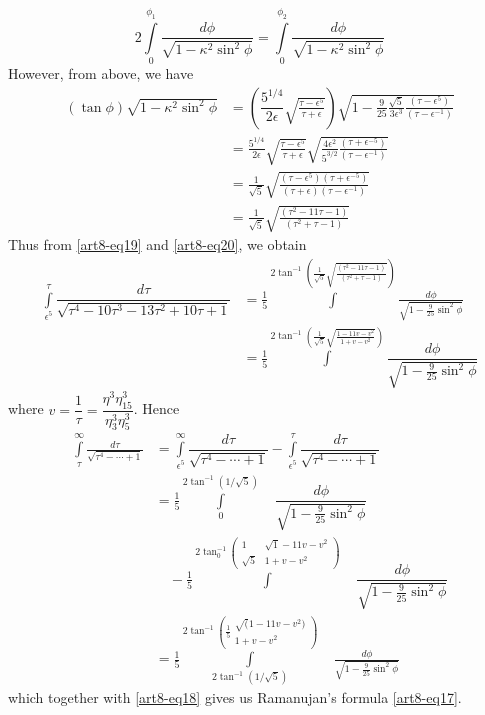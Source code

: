 \begin{equation}
2\int\limits^{\phi_{1}}_{0}\dfrac{d\phi}{\sqrt{1-\kappa^{2}\sin^{2}\phi}}=\int\limits^{\phi_{2}}_{0}\dfrac{d\phi}{\sqrt{1-\kappa^{2}\sin^{2}\phi}}\label{art8-eq20}
\end{equation}
However, from above, we have
\begin{align*}
(\tan \phi)\sqrt{1-\kappa^{2}\sin^{2}\phi} &=\left(\dfrac{5^{1/4}}{2\epsilon}\sqrt{\frac{\tau-\epsilon^{5}}{\tau+\epsilon}}\right)\sqrt{1-\frac{9}{25}\frac{\sqrt{5}}{3\epsilon^{3}}\frac{(\tau-\epsilon^{5})}{(\tau-\epsilon^{-1})}}\\
&= \frac{5^{1/4}}{2\epsilon}\sqrt{\frac{\tau-\epsilon^{5}}{\tau+\epsilon}}\sqrt{\frac{4\epsilon^{2}}{5^{3/2}}\frac{(\tau+\epsilon^{-5})}{(\tau-\epsilon^{-1})}}\\
&= \frac{1}{\sqrt{5}}\sqrt{\frac{(\tau-\epsilon^{5})(\tau+\epsilon^{-5})}{(\tau+\epsilon)(\tau-\epsilon^{-1})}}\\
&= \frac{1}{\sqrt{5}}\sqrt{\frac{(\tau^{2}-11\tau-1)}{(\tau^{2}+\tau-1)}}
\end{align*}\pageoriginale
Thus from \eqref{art8-eq19} and \eqref{art8-eq20}, we obtain
\begin{align*}
\int\limits^{\tau}_{\epsilon^{5}}\dfrac{d\tau}{\sqrt{\tau^{4}-10\tau^{3}-13\tau^{2}+10\tau+1}} &= \frac{1}{5}\int\limits^{2\tan^{-1}\left(\frac{1}{\sqrt{5}}\sqrt{\frac{(\tau^{2}-11\tau-1)}{(\tau^{2}+\tau-1)}}\right)}\frac{d\phi}{\sqrt{1-\frac{9}{25}\sin^{2}\phi}}\\
&= \frac{1}{5}\int\limits^{2\tan^{-1}\left(\frac{1}{\sqrt{5}}\sqrt{\frac{1-11v-v^{2}}{1+v-v^{2}}}\right)}\dfrac{d\phi}{\sqrt{1-\frac{9}{25}\sin^{2}\phi}}
\end{align*}
where $v=\dfrac{1}{\tau}=\dfrac{\eta^{3}\eta^{3}_{15}}{\eta^{3}_{3}\eta^{3}_{5}}$. Hence
\begin{align*}
\int\limits^{\infty}_{\tau}\frac{d\tau}{\sqrt{\tau^{4}-\cdots+1}} &= \int\limits^{\infty}_{\epsilon^{5}}\dfrac{d\tau}{\sqrt{\tau^{4}-\cdots+1}}-\int\limits^{\tau}_{\epsilon^{5}}\dfrac{d\tau}{\sqrt{\tau^{4}-\cdots+1}}\\
&= \frac{1}{5}\int\limits^{2\tan^{-1}(1/\sqrt{5})}_{0}\quad \dfrac{d\phi}{\sqrt{1-\frac{9}{25}\sin^{2}\phi}}\\
&\quad {}-\frac{1}{5}\int\limits^{2\tan^{-1}_{0}\left(\begin{smallmatrix} 1 & \surd 1-11v-v^{2}\\ \sqrt{5} & 1+v-v^{2}\end{smallmatrix}\right)}\quad \dfrac{d\phi}{\sqrt{1-\frac{9}{25}\sin^{2}\phi}}\\
&=\frac{1}{5}\int\limits^{2\tan^{-1}\left(\frac{1}{5}\begin{smallmatrix} \surd (1-11v-v^{2})\\ 1+v-v^{2}\end{smallmatrix}\right)}_{2\tan^{-1}(1/\sqrt{5})}\quad \frac{d\phi}{\sqrt{1-\frac{9}{25}\sin^{2}\phi}}
\end{align*}
which together with \eqref{art8-eq18} gives us Ramanujan's formula \eqref{art8-eq17}.

